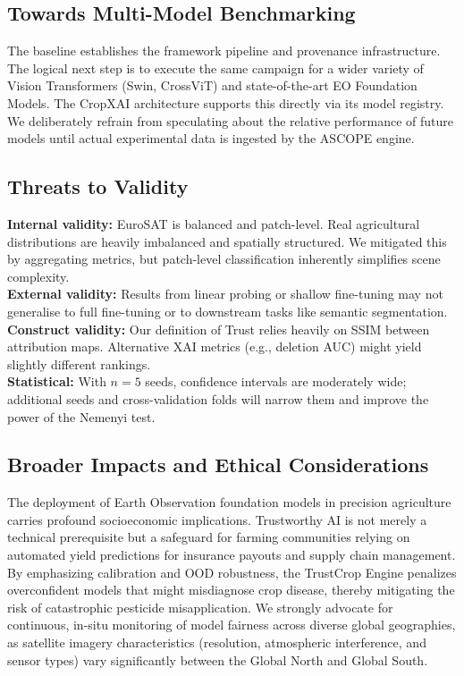 \documentclass[10pt,journal]{IEEEtran}
\begin{document}
\subsection{Towards Multi-Model Benchmarking}
The baseline establishes the framework pipeline and provenance
infrastructure. The logical next step is to execute the same campaign for
a wider variety of Vision Transformers (Swin, CrossViT) and state-of-the-art EO Foundation Models. The CropXAI architecture supports this directly via its model registry.
We deliberately refrain from speculating about the relative performance of
future models until actual experimental data is ingested by the ASCOPE engine.

\subsection{Threats to Validity}
\textbf{Internal validity:} EuroSAT is balanced and patch-level. Real
agricultural distributions are heavily imbalanced and spatially structured. We mitigated this by aggregating metrics, but patch-level classification inherently simplifies scene complexity.\\
\textbf{External validity:} Results from linear probing or shallow fine-tuning
may not generalise to full fine-tuning or to downstream tasks like semantic segmentation.\\
\textbf{Construct validity:} Our definition of Trust relies heavily on SSIM between attribution maps. Alternative XAI metrics (e.g., deletion AUC) might yield slightly different rankings.\\
\textbf{Statistical:} With $n = 5$ seeds, confidence intervals are moderately wide;
additional seeds and cross-validation folds will narrow them and improve the power of the Nemenyi test.

\subsection{Broader Impacts and Ethical Considerations}
The deployment of Earth Observation foundation models in precision agriculture carries profound socioeconomic implications. Trustworthy AI is not merely a technical prerequisite but a safeguard for farming communities relying on automated yield predictions for insurance payouts and supply chain management. By emphasizing calibration and OOD robustness, the TrustCrop Engine penalizes overconfident models that might misdiagnose crop disease, thereby mitigating the risk of catastrophic pesticide misapplication. We strongly advocate for continuous, in-situ monitoring of model fairness across diverse global geographies, as satellite imagery characteristics (resolution, atmospheric interference, and sensor types) vary significantly between the Global North and Global South.
\end{document}
